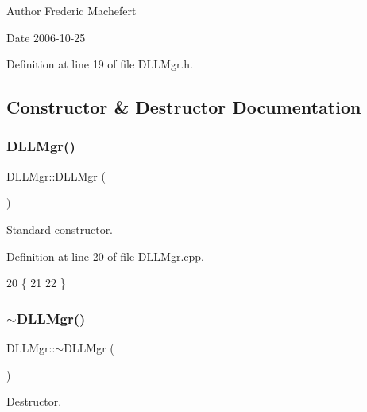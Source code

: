 \begin{DoxyAuthor}{Author}
Frederic Machefert 
\end{DoxyAuthor}
\begin{DoxyDate}{Date}
2006-\/10-\/25 
\end{DoxyDate}


Definition at line 19 of file D\+L\+L\+Mgr.\+h.



\subsection{Constructor \& Destructor Documentation}
\mbox{\label{classDLLMgr_a3751927270f2acc954d9171e1f109876}} 
\subsubsection{\texorpdfstring{D\+L\+L\+Mgr()}{DLLMgr()}}
{\footnotesize\ttfamily D\+L\+L\+Mgr\+::\+D\+L\+L\+Mgr (\begin{DoxyParamCaption}{ }\end{DoxyParamCaption})}



Standard constructor. 



Definition at line 20 of file D\+L\+L\+Mgr.\+cpp.


\begin{DoxyCode}
20                  \{
21 
22 \}
\end{DoxyCode}
\mbox{\label{classDLLMgr_a80e79a573af874023318064ad9d32e74}} 
\subsubsection{\texorpdfstring{$\sim$\+D\+L\+L\+Mgr()}{~DLLMgr()}}
{\footnotesize\ttfamily D\+L\+L\+Mgr\+::$\sim$\+D\+L\+L\+Mgr (\begin{DoxyParamCaption}{ }\end{DoxyParamCaption})\hspace{0.3cm}{\ttfamily [virtual]}}



Destructor. 



